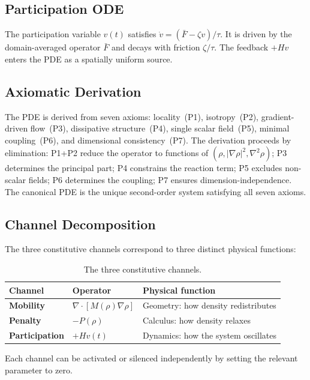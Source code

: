 \documentclass[11pt]{article}
\begin{document}
\subsection{Participation ODE}

The participation variable \(v(t)\) satisfies \(\dot{v} = (\bar{F} - \zeta v)/\tau\). It is driven by the domain-averaged operator \(\bar{F}\) and decays with friction \(\zeta/\tau\). The feedback \(+Hv\) enters the PDE as a spatially uniform source.

\subsection{Axiomatic Derivation}

The PDE is derived from seven axioms: locality~(P1), isotropy~(P2), gradient-driven flow~(P3), dissipative structure~(P4), single scalar field~(P5), minimal coupling~(P6), and dimensional consistency~(P7). The derivation proceeds by elimination: P1+P2 reduce the operator to functions of \((\rho, |\nabla\rho|^2, \nabla^2\rho)\); P3 determines the principal part; P4 constrains the reaction term; P5 excludes non-scalar fields; P6 determines the coupling; P7 ensures dimension-independence. The canonical PDE is the unique second-order system satisfying all seven axioms.

\subsection{Channel Decomposition}

The three constitutive channels correspond to three distinct physical functions:

\begin{table}[h]
\centering
\begin{tabular}{@{}lll@{}}
\toprule
Channel & Operator & Physical function \\
\midrule
\textbf{Mobility} & \(\nabla\!\cdot\![M(\rho)\nabla\rho]\) & Geometry: how density redistributes \\
\textbf{Penalty} & \(-P(\rho)\) & Calculus: how density relaxes \\
\textbf{Participation} & \(+Hv(t)\) & Dynamics: how the system oscillates \\
\bottomrule
\end{tabular}
\caption{The three constitutive channels.}
\label{tab:channels}
\end{table}

Each channel can be activated or silenced independently by setting the relevant parameter to zero.
\end{document}
